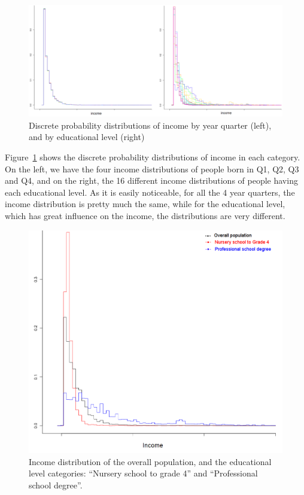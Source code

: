 \begin{figure}[h!]
\caption{Discrete probability distributions of income by year quarter (left), and by educational level (right)}
\begin{center}
  \includegraphics[width=1\linewidth]{./Figures/birthquarter-education.png}
\end{center}
\label{fig:income-education}
\end{figure}

Figure~\ref{fig:income-education} shows the discrete probability distributions of income in each category. On the left,
we have the four income distributions of people born in Q1, Q2, Q3 and Q4, and on the
right, the 16 different income distributions of people having each educational level. As it is easily noticeable, for
all the 4 year quarters, the income distribution is pretty much the same, while for the educational level, which has
great influence on the income, the distributions are very different.

\begin{figure}[h!]
\caption{Income distribution of the overall population, and the educational level categories: ``Nursery school to grade
4'' and ``Professional school degree''.}
\begin{center}
  \includegraphics[width=0.7\linewidth]{./Figures/prof-nurs.png}
\end{center}
\label{fig:prof-nurs}
\end{figure}

